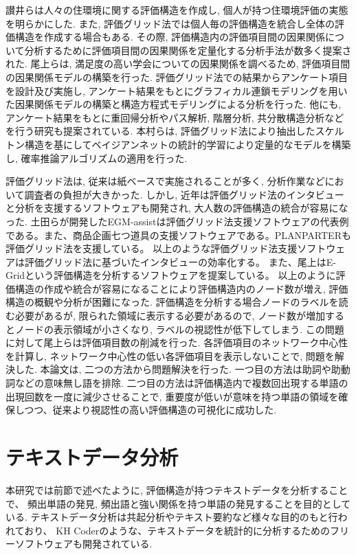 \documentclass[syuuron]{kuee}
\begin{document}
		讃井らは人々の住環境に関する評価構造を作成し, 個人が持つ住環境評価の実態を明らかにした. 
		また, 評価グリッド法では個人毎の評価構造を統合し全体の評価構造を作成する場合もある. 
		その際, 評価構造内の評価項目間の因果関係について分析するために評価項目間の因果関係を定量化する分析手法が数多く提案された. 
		尾上らは, 満足度の高い学会についての因果関係を調べるため, 評価項目間の因果関係モデルの構築を行った\cite{egm8}. 
		評価グリッド法での結果からアンケート項目を設計及び実施し, アンケート結果をもとにグラフィカル連鎖モデリングを用いた因果関係モデルの構築と構造方程式モデリングによる分析を行った. 
		他にも, アンケート結果をもとに重回帰分析やパス解析, 階層分析, 共分散構造分析などを行う研究も提案されている. 
		本村らは, 評価グリッド法により抽出したスケルトン構造を基にしてベイジアンネットの統計的学習により定量的なモデルを構築し, 確率推論アルゴリズムの適用を行った\cite{egm9}. 
		
		評価グリッド法は, 従来は紙ベースで実施されることが多く, 分析作業などにおいて調査者の負担が大きかった. 
		しかし, 近年は評価グリッド法のインタビューと分析を支援するソフトウェアも開発され, 大人数の評価構造の統合が容易になった. 
		土田らが開発したEGM-assistは評価グリッド法支援ソフトウェアの代表例である。また、商品企画七つ道具の支援ソフトウェアである。PLANPARTERも評価グリッド法を支援している。
		以上のような評価グリッド法支援ソフトウェアは評価グリッド法に基づいたインタビューの効率化する。
		また、尾上はE-Gridという評価構造を分析するソフトウェアを提案している。
		以上のように評価構造の作成や統合が容易になることにより評価構造内のノード数が増え, 評価構造の概観や分析が困難になった. 
		評価構造を分析する場合ノードのラベルを読む必要があるが, 限られた領域に表示する必要があるので, 
		ノード数が増加するとノードの表示領域が小さくなり, ラベルの視認性が低下してしまう. 
		この問題に対して尾上らは評価項目数の削減を行った\cite{net1}. 
		各評価項目のネットワーク中心性を計算し, ネットワーク中心性の低い各評価項目を表示しないことで, 問題を解決した. 
		本論文は, 二つの方法から問題解決を行った. 
		一つ目の方法は助詞や助動詞などの意味無し語を排除. 二つ目の方法は評価構造内で複数回出現する単語の出現回数を一度に減少させることで, 
		重要度が低いが意味を持つ単語の領域を確保しつつ、従来より視認性の高い評価構造の可視化に成功した. 
		
	\section{テキストデータ分析}
		本研究では前節で述べたように, 評価構造が持つテキストデータを分析することで、
		頻出単語の発見, 頻出語と強い関係を持つ単語の発見することを目的としている.  
		テキストデータ分析は共起分析やテキスト要約など様々な目的のもと行われており、
		KH Coderのような、テキストデータを統計的に分析するためのフリーソフトウェアも開発されている. 
		
\end{document}

